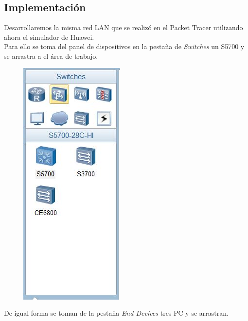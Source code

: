 \documentclass[journal]{IEEEtran}
\begin{document}
\subsection{Implementación}
Desarrollaremos la misma red LAN que se realizó en el Packet Tracer utilizando ahora el simulador de Huawei.\\
Para ello se toma del panel de dispositivos en la pestaña de \textit{Switches} un S5700 y se arrastra a el área de trabajo.
\begin{center}
\begin{figure}[H]
\centering
\includegraphics[scale=0.65]{3.JPG} 
\end{figure}
\end{center}
De igual forma se toman de la pestaña \textit{End Devices} tres PC y se arrastran.
\end{document}

